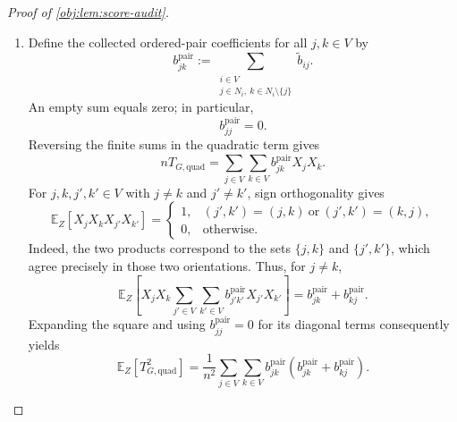 \begin{proof}[Proof of \cref{obj:lem:score-audit}]
\begin{enumerate}
The sign orthogonality above, applied to singleton sets, gives
\[
\mathbb E_Z[T_{G,\mathrm{lin}}^2]
=
\frac4{n^2}\sum_{j\in V}
\left(\sum_{\substack{i\in V\\j\in N_i}}\mu_i\right)^2.
\]
For each \(j\), finite Cauchy--Schwarz and the coordinate multiplicity bound yield
\[
\left(\sum_{\substack{i\in V\\j\in N_i}}\mu_i\right)^2
\le
\left|\{i\in V:j\in N_i\}\right|
\sum_{\substack{i\in V\\j\in N_i}}\mu_i^2
\le
d_+\sum_{\substack{i\in V\\j\in N_i}}\mu_i^2.
\]
Summing and reversing the finite sums gives
\[
\begin{aligned}
\sum_{j\in V}
\left(\sum_{\substack{i\in V\\j\in N_i}}\mu_i\right)^2
&\le d_+\sum_{j\in V}\sum_{\substack{i\in V\\j\in N_i}}\mu_i^2\\
&=d_+\sum_{i\in V}|N_i|\mu_i^2\\
&\le d_+\sum_{i\in V}d_+
=nd_+^2.
\end{aligned}
\]
Since \(n\ge4\), scaling by \(4/n^2\) therefore gives
\[
\mathbb E_Z[T_{G,\mathrm{lin}}^2]\le\frac{4d_+^2}{n}.
\]

\item Define the collected ordered-pair coefficients for all \(j,k\in V\) by
\[
b^{\mathrm{pair}}_{jk}
:=
\sum_{\substack{i\in V\\j\in N_i,\ k\in N_i\setminus\{j\}}}
\widetilde b_{ij}.
\]
An empty sum equals zero; in particular,
\[
b^{\mathrm{pair}}_{jj}=0.
\]
Reversing the finite sums in the quadratic term gives
\[
nT_{G,\mathrm{quad}}
=\sum_{j\in V}\sum_{k\in V}b^{\mathrm{pair}}_{jk}X_jX_k.
\]
For \(j,k,j',k'\in V\) with \(j\ne k\) and \(j'\ne k'\), sign orthogonality gives
\[
\mathbb E_Z[X_jX_kX_{j'}X_{k'}]
=
\begin{cases}
1,&(j',k')=(j,k)\ \text{or}\ (j',k')=(k,j),\\
0,&\text{otherwise}.
\end{cases}
\]
Indeed, the two products correspond to the sets \(\{j,k\}\) and \(\{j',k'\}\), which agree precisely in those two orientations. Thus, for \(j\ne k\),
\[
\mathbb E_Z\!\left[
X_jX_k\sum_{j'\in V}\sum_{k'\in V}
b^{\mathrm{pair}}_{j'k'}X_{j'}X_{k'}
\right]
=b^{\mathrm{pair}}_{jk}+b^{\mathrm{pair}}_{kj}.
\]
Expanding the square and using \(b^{\mathrm{pair}}_{jj}=0\) for its diagonal terms consequently yields
\[
\mathbb E_Z[T_{G,\mathrm{quad}}^2]
=
\frac1{n^2}\sum_{j\in V}\sum_{k\in V}
b^{\mathrm{pair}}_{jk}
\left(b^{\mathrm{pair}}_{jk}+b^{\mathrm{pair}}_{kj}\right).
\]


\end{enumerate}
\end{proof}
